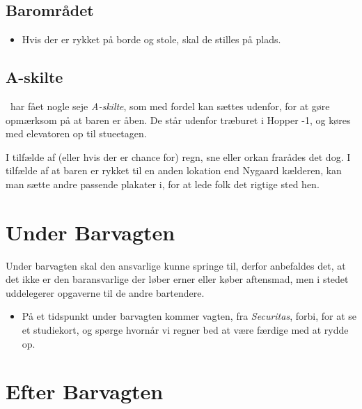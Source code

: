 \subsection{Barområdet}
\label{sec:pre:baromradet}

\begin{itemize}
    \item Hvis der er rykket på borde og stole, skal de stilles på plads.
\end{itemize}

\subsection{A-skilte}
\label{sec:pre:a-skilte}

\fredagscafeen\ har fået nogle seje \textit{A-skilte},
som med fordel kan sættes udenfor,
for at gøre opmærksom på at baren er åben.
De står udenfor træburet i Hopper -1, og
køres med elevatoren op til stueetagen.

I tilfælde af (eller hvis der er chance for) regn, sne eller orkan
frarådes det dog.
I tilfælde af at baren er rykket til en anden lokation end Nygaard kælderen,
kan man sætte andre passende plakater i, for at lede folk det rigtige sted hen.

\section{Under Barvagten}
\label{sec:intra-barvagten}

Under barvagten skal den ansvarlige kunne springe til,
derfor anbefaldes det, at det ikke er den baransvarlige
der løber erner eller køber aftensmad, men i stedet uddelegerer
opgaverne til de andre bartendere.

\begin{itemize}
    \item På et tidspunkt under barvagten kommer vagten, fra \textit{Securitas}, forbi,
    for at se et studiekort, og spørge hvornår vi regner bed at være færdige med at rydde op.
\end{itemize}

\section{Efter Barvagten}
\label{sec:post-barvagten}

